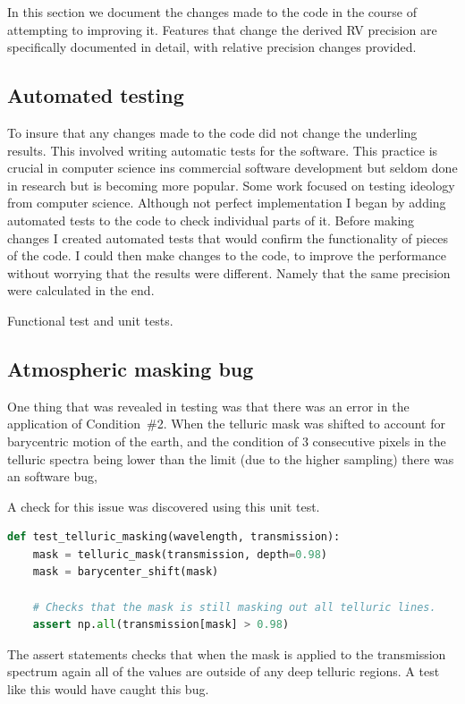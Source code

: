 In this section we document the changes made to the code in the course of attempting to improving it. Features that change the derived {RV} precision are specifically documented in detail, with relative precision changes provided.

\subsection{Automated testing}
To insure that any changes made to the code did not change the underling results. This involved writing automatic tests for the software. This practice is crucial in computer science ins commercial software development but seldom done in research but is becoming more popular. 
Some work focused on testing ideology from computer science. Although not perfect implementation I began by adding automated tests to the code to check individual parts of it.
Before making changes I created automated tests that would confirm the functionality of pieces of the code. I could then make changes to the code, to improve the performance without worrying that the results were different.
Namely that the same precision were calculated in the end.

Functional test and unit tests.

\subsection{Atmospheric masking bug}
One thing that was revealed in testing was that there was an error in the application of Condition~\#2. When the telluric mask was shifted to account for barycentric motion of the earth, and the condition of 3 consecutive pixels in the telluric spectra being lower than the limit (due to the higher sampling) there was an software bug,


A check for this issue was discovered using this unit test.
\begin{lstlisting}[language=Python, caption=Example unit test to catch masking bug.]
def test_telluric_masking(wavelength, transmission):
    mask = telluric_mask(transmission, depth=0.98)
    mask = barycenter_shift(mask)

    # Checks that the mask is still masking out all telluric lines.
    assert np.all(transmission[mask] > 0.98)
\end{lstlisting}
The assert statements checks that when the mask is applied to the transmission spectrum again all of the values are outside of any deep telluric regions. A test like this would have caught this bug.

